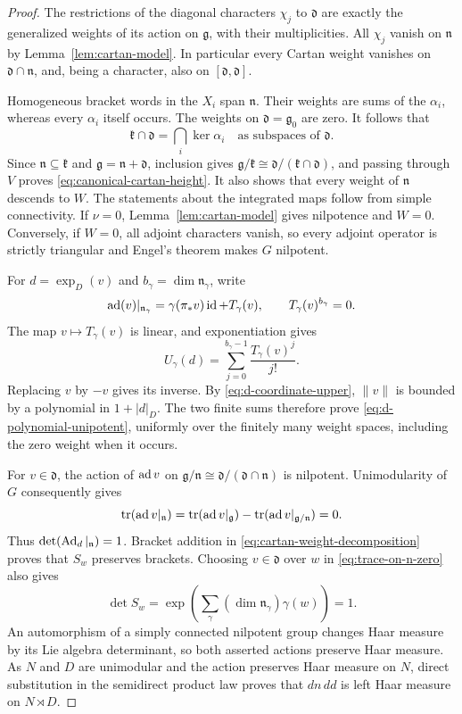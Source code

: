 \begin{proof}
The restrictions of the diagonal characters $\chi_j$ to $\mathfrak d$
are exactly the generalized weights of its action on $\mathfrak g$,
with their multiplicities.  All $\chi_j$ vanish on $\mathfrak n$ by
Lemma~\ref{lem:cartan-model}.  In particular every Cartan weight
vanishes on $\mathfrak d\cap\mathfrak n$, and, being a character, also
on $[\mathfrak d,\mathfrak d]$.

Homogeneous bracket words in the $X_i$ span $\mathfrak n$.
Their weights are sums of the $\alpha_i$, whereas every $\alpha_i$
itself occurs.  The weights on $\mathfrak d=\mathfrak g_0$ are zero.
It follows that
\[
 \mathfrak k\cap\mathfrak d=\bigcap_i\ker\alpha_i
       \quad\text{as subspaces of }\mathfrak d.
\]
Since $\mathfrak n\subseteq\mathfrak k$ and
$\mathfrak g=\mathfrak n+\mathfrak d$, inclusion gives
$\mathfrak g/\mathfrak k\cong\mathfrak d/(\mathfrak k\cap\mathfrak d)$, and passing
through $V$ proves \eqref{eq:canonical-cartan-height}.
It also shows that every weight of $\mathfrak n$ descends to $W$.
The statements about the integrated maps follow from simple connectivity.
If $\nu=0$, Lemma~\ref{lem:cartan-model} gives nilpotence and $W=0$.
Conversely, if $W=0$, all adjoint characters vanish, so every adjoint
operator is strictly triangular and Engel's theorem makes $G$ nilpotent.

For $d=\exp_D(v)$ and $b_\gamma=\dim\mathfrak n_\gamma$, write
\[
 \operatorname{ad}(v)|_{\mathfrak n_\gamma}
    =\gamma(\pi_*v)\operatorname{id}+T_\gamma(v),
 \qquad T_\gamma(v)^{b_\gamma}=0.
\]
The map $v\mapsto T_\gamma(v)$ is linear, and exponentiation gives
\[
 U_\gamma(d)=
   \sum_{j=0}^{b_\gamma-1}\frac{T_\gamma(v)^j}{j!}.
\]
Replacing $v$ by $-v$ gives its inverse.  By
\eqref{eq:d-coordinate-upper}, $\|v\|$ is bounded by a polynomial in
$1+|d|_D$.  The two finite sums therefore prove
\eqref{eq:d-polynomial-unipotent}, uniformly over the finitely many
weight spaces, including the zero weight when it occurs.

For $v\in\mathfrak d$, the action of $\operatorname{ad} v$ on
$\mathfrak g/\mathfrak n\cong
\mathfrak d/(\mathfrak d\cap\mathfrak n)$ is nilpotent.  Unimodularity
of $G$ consequently gives
\begin{equation}\label{eq:trace-on-n-zero}
 \operatorname{tr}(\operatorname{ad} v|_{\mathfrak n})
 =\operatorname{tr}(\operatorname{ad} v|_{\mathfrak g})
   -\operatorname{tr}(\operatorname{ad} v|_{\mathfrak g/\mathfrak n})=0.
\end{equation}
Thus $\det(\operatorname{Ad}_d|_{\mathfrak n})=1$.  Bracket addition in
\eqref{eq:cartan-weight-decomposition} proves that $S_w$ preserves
brackets.  Choosing $v\in\mathfrak d$ over $w$ in
\eqref{eq:trace-on-n-zero} also gives
\[
 \det S_w
 =\exp\left(\sum_\gamma
                  (\dim\mathfrak n_\gamma)\gamma(w)\right)=1.
\]
An automorphism of a simply connected nilpotent group changes Haar
measure by its Lie algebra determinant, so both asserted actions
preserve Haar measure.  As $N$ and $D$ are unimodular and the action
preserves Haar measure on $N$, direct substitution in the semidirect
product law proves that $dn\,dd$ is left Haar measure on $N\rtimes D$.


\end{proof}
